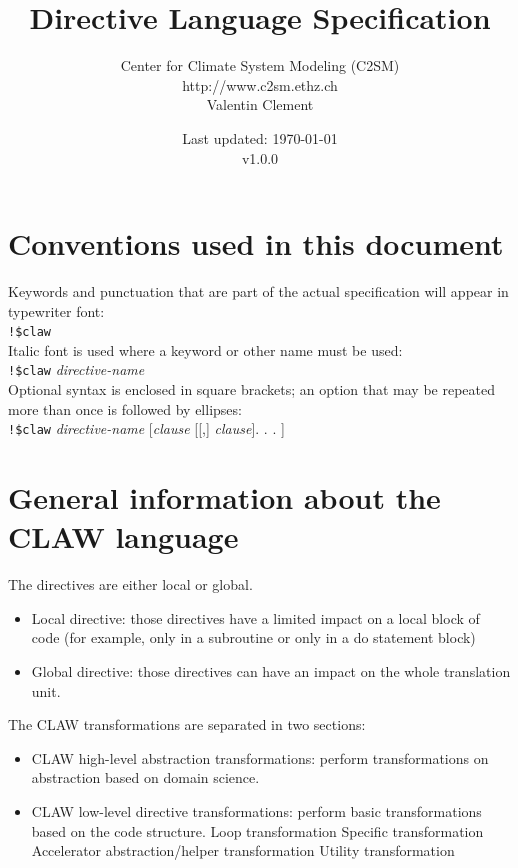 \documentclass{article}
\title{\LARGE Directive Language Specification}
\author{Center for Climate System Modeling (C2SM)\\http://www.c2sm.ethz.ch\\Valentin Clement}
\date{Last updated: \today \\\vspace{1em}v1.0.0}
\begin{document}
\maketitle

\tableofcontents

\section*{Conventions used in this document}

Keywords and punctuation that are part of the actual specification will appear
in typewriter font: \\

\lstinline|!$claw|\\

Italic font is used where a keyword or other name must be used: \\

\lstinline|!$claw| \textit{directive-name}\\

Optional syntax is enclosed in square brackets; an option that may be repeated
more than once is followed by ellipses:\\

\lstinline|!$claw| \textit{directive-name} [\textit{clause}
[[,] \textit{clause}]. . . ]

\section{General information about the CLAW language}
The directives are either local or global.

\begin{itemize}
\item Local directive: those directives have a limited impact on a local block
of code (for example, only in a subroutine or only in a do statement block)
\item Global directive: those directives can have an impact on the whole
translation unit.
\end{itemize}

The CLAW transformations are separated in two sections:
\begin{itemize}
\item CLAW high-level abstraction transformations: perform transformations
on abstraction based on domain science.
\item CLAW low-level directive transformations: perform basic transformations
based on the code structure.
\subitem Loop transformation
\subitem Specific transformation
\subitem Accelerator abstraction/helper transformation
\subitem Utility transformation
\end{itemize}
\end{document}
